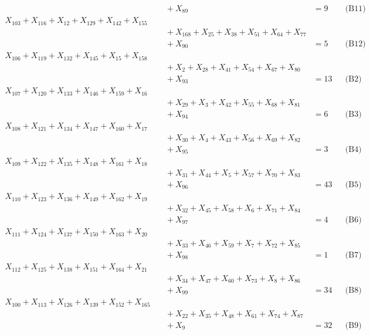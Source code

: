 \documentclass[a4paper,10pt]{article}
\begin{document}
{\begin{align}
&\quad  + X_{89} &= 9 && \text{(B11)} \\
X_{103} + X_{116} + X_{12} + X_{129} + X_{142} + X_{155} \\[0.5ex]
&\quad  + X_{168} + X_{25} + X_{38} + X_{51} + X_{64} + X_{77} \\[0.5ex]
&\quad  + X_{90} &= 5 && \text{(B12)} \\
X_{106} + X_{119} + X_{132} + X_{145} + X_{15} + X_{158} \\[0.5ex]
&\quad  + X_{2} + X_{28} + X_{41} + X_{54} + X_{67} + X_{80} \\[0.5ex]
&\quad  + X_{93} &= 13 && \text{(B2)} \\
X_{107} + X_{120} + X_{133} + X_{146} + X_{159} + X_{16} \\[0.5ex]
&\quad  + X_{29} + X_{3} + X_{42} + X_{55} + X_{68} + X_{81} \\[0.5ex]
&\quad  + X_{94} &= 6 && \text{(B3)} \\
\allowbreak
X_{108} + X_{121} + X_{134} + X_{147} + X_{160} + X_{17} \\[0.5ex]
&\quad  + X_{30} + X_{4} + X_{43} + X_{56} + X_{69} + X_{82} \\[0.5ex]
&\quad  + X_{95} &= 3 && \text{(B4)} \\
X_{109} + X_{122} + X_{135} + X_{148} + X_{161} + X_{18} \\[0.5ex]
&\quad  + X_{31} + X_{44} + X_{5} + X_{57} + X_{70} + X_{83} \\[0.5ex]
&\quad  + X_{96} &= 43 && \text{(B5)} \\
X_{110} + X_{123} + X_{136} + X_{149} + X_{162} + X_{19} \\[0.5ex]
&\quad  + X_{32} + X_{45} + X_{58} + X_{6} + X_{71} + X_{84} \\[0.5ex]
&\quad  + X_{97} &= 4 && \text{(B6)} \\
X_{111} + X_{124} + X_{137} + X_{150} + X_{163} + X_{20} \\[0.5ex]
&\quad  + X_{33} + X_{46} + X_{59} + X_{7} + X_{72} + X_{85} \\[0.5ex]
&\quad  + X_{98} &= 1 && \text{(B7)} \\
X_{112} + X_{125} + X_{138} + X_{151} + X_{164} + X_{21} \\[0.5ex]
&\quad  + X_{34} + X_{47} + X_{60} + X_{73} + X_{8} + X_{86} \\[0.5ex]
&\quad  + X_{99} &= 34 && \text{(B8)} \\
X_{100} + X_{113} + X_{126} + X_{139} + X_{152} + X_{165} \\[0.5ex]
&\quad  + X_{22} + X_{35} + X_{48} + X_{61} + X_{74} + X_{87} \\[0.5ex]
&\quad  + X_{9} &= 32 && \text{(B9)} \\
\end{align}}
\end{document}
